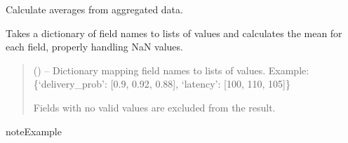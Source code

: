 \documentclass[a4paper,11pt,english,openany,oneside]{sphinxmanual}
\begin{document}
\begin{fulllineitems}
\label{\detokenize{modules/core:core.averager.average_group_data}}
\pysigstartsignatures
\pysiglinewithargsret
{}
{}
{}
\pysigstopsignatures
\sphinxAtStartPar
Calculate averages from aggregated data.

\sphinxAtStartPar
Takes a dictionary of field names to lists of values and calculates
the mean for each field, properly handling NaN values.
\begin{quote}\begin{description}
\sphinxAtStartPar
{} () – Dictionary mapping field names to lists of values.
Example: \{‘delivery\_prob’: {[}0.9, 0.92, 0.88{]}, ‘latency’: {[}100, 110, 105{]}\}

\sphinxAtStartPar
\begin{description}
\sphinxAtStartPar
Fields with no valid values are excluded from the result.

\end{description}


\sphinxAtStartPar
{}

\end{description}\end{quote}

\begin{sphinxadmonition}{note}{Example}

\begin{sphinxVerbatim}[commandchars=\\\{\}]
   \PYG{p}{[}  \PYG{p}{]}  \PYG{p}{[} \PYG{p}{]}
  
  
\end{sphinxVerbatim}
\end{sphinxadmonition}

\end{fulllineitems}
\end{document}
